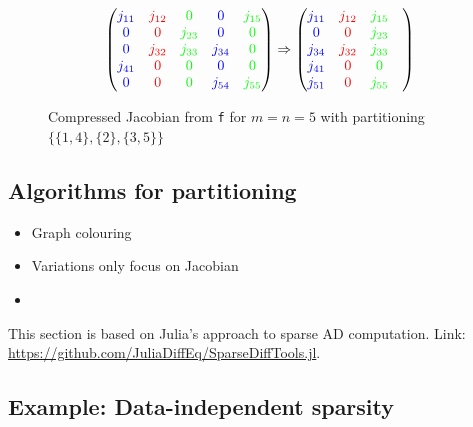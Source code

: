 \begin{figure}[H]
		$$ \left(\begin{matrix}
	{\color{blue} j_{11}} & {\color{red} j_{12}} & {\color{green} 0 }        &  {\color{blue} 0 }       & {\color{green} j_{15}} \\
	{\color{blue} 0}        & {\color{red} 0 }       & {\color{green} j_{23}}  &  {\color{blue} 0 }      & {\color{green} 0} \\
	{\color{blue} 0}        & {\color{red}j_{32}} &  {\color{green} j_{33}}  & {\color{blue} j_{34}} & {\color{green} 0 } \\
	{\color{blue} j_{41}} & {\color{red} 0 }       & {\color{green} 0 }         & {\color{blue} 0 }        & {\color{green} 0} \\
	{\color{blue} 0 }       & {\color{red} 0 }       & {\color{green} 0 }         & {\color{blue} j_{54}} & {\color{green} j_{55} }
	\end{matrix}\right) \Rightarrow \left(\begin{matrix}
	{\color{blue} j_{11}} & {\color{red} j_{12}} & {\color{green} j_{15}} \\
	{\color{blue} 0} & {\color{red} 0} & {\color{green} j_{23}} \\
	{\color{blue} j_{34}} & {\color{red} j_{32}} & {\color{green} j_{33}}  \\
	{\color{blue} j_{41}} & {\color{red} 0} & {\color{green} 0}  \\
	{\color{blue} j_{51}} & {\color{red} 0} & {\color{green} j_{55}} &  
	\end{matrix}\right) $$
	\caption{Compressed Jacobian from \texttt{f} for $m=n=5$ with partitioning $\{\{1,4\}, \{2\}, \{3,5\}\}$}
\end{figure}


\subsection{Algorithms for partitioning}
\begin{itemize}
	\item Graph colouring 
	\item Variations only focus on Jacobian
	\item
\end{itemize}

This section is based on Julia's approach to sparse AD computation. 
Link: \url{https://github.com/JuliaDiffEq/SparseDiffTools.jl}. 


\subsection{Example: Data-independent sparsity}

